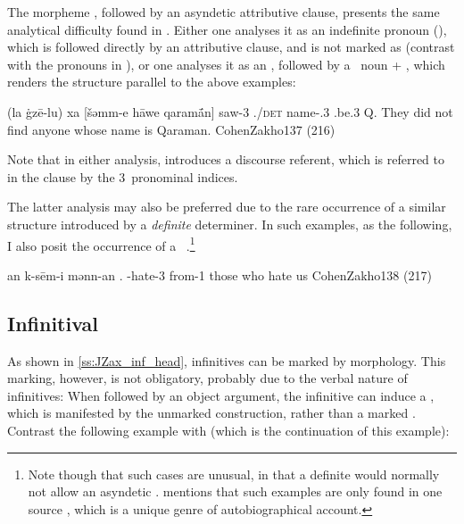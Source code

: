 The morpheme , followed by an asyndetic attributive clause, presents the same analytical difficulty found in . Either one analyses it as an indefinite pronoun (), which is followed directly by an attributive clause, and is not marked as \cst* (contrast with the \cst* pronouns in ), or one analyses it as an , followed by a \zero\ \prim noun + , which  renders the structure parallel to the above examples:

{(la ġzē-lu) xa \opt{\zero} [šəmm-e hāwe qaramā́n]}
{\neg{} saw-3\pl{} \indef.\pro/\textsc{det} \opt{\zero} name-\poss.3\masc{} \sbjv.be.3\masc{} Q.}
{They did not find anyone whose name is Qaraman.}
{CohenZakho}{137 (216)}

Note that in either analysis,  introduces a discourse referent, which is referred to in the \secn clause by the 3\masc\ pronominal indices. 

The latter analysis may also be preferred due to the rare occurrence of a similar structure introduced by a \textit{definite} determiner. In such examples, as the following, I also posit the occurrence of a \zero\ \prim.\footnote{Note though that such cases are unusual, in that a definite \prim would normally not allow an asyndetic . \citet[138]{CohenZakho} mentions that such examples are only found in one source \citep{SabarAgonies}, which is a unique genre of autobiographical account.} 

{an \zero{} k-sēm-i mənn-an}
{.\pl{} \zero{} \ind-hate-3\pl{} from-1\pl }
{those who hate us}
{CohenZakho}{138 (217)}




\subsection{Infinitival \prims}

As shown in \ref{ss:JZax_inf_head}, infinitives can be marked by \cst* morphology. This marking, however, is not obligatory, probably due to the verbal nature of infinitives: When followed by an object argument, the infinitive can induce a , which is manifested by the unmarked  construction, rather than a marked . Contrast the following example with  (which is the continuation of this example):



